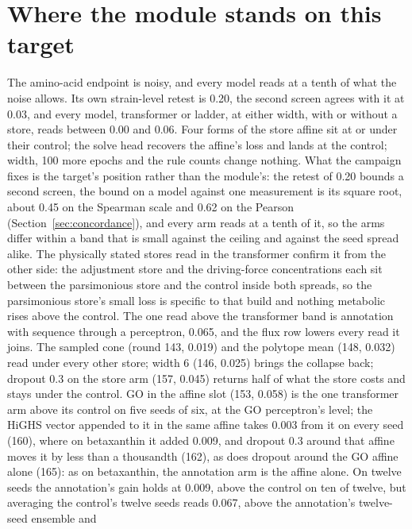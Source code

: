 \section{Where the module stands on this target}
\label{sec:standing}

The amino-acid endpoint is noisy, and every model reads at a tenth of what the noise
allows. Its own strain-level retest is 0.20, the second screen agrees with it at 0.03,
and every model, transformer or ladder, at either width, with or without a store, reads
between 0.00 and 0.06. Four forms of the store affine sit at or under their control; the
solve head recovers the affine's loss and lands at the control; width, 100 more epochs
and the rule counts change nothing. What the campaign fixes is the target's position
rather than the module's: the retest of 0.20 bounds a second screen, the bound on a
model against one measurement is its square root, about 0.45 on the Spearman scale and
0.62 on the Pearson (Section~\ref{sec:concordance}), and every arm reads at a tenth of
it, so the arms differ within a band that is small against the ceiling and against the
seed spread alike. The physically
stated stores read in the transformer confirm it from the other side: the adjustment
store and the driving-force concentrations each sit between the parsimonious store and
the control inside both spreads, so the parsimonious store's small loss is specific to
that build and nothing metabolic rises above the control. The one read above the
transformer band is annotation with sequence through a perceptron, 0.065, and the flux
row lowers every read it joins. The sampled cone (round 143, 0.019) and the polytope
mean (148, 0.032) read under every other store; width 6 (146, 0.025) brings the
collapse back; dropout 0.3 on the store arm (157, 0.045) returns half of what the store
costs and stays under the control. GO in the affine slot (153, 0.058) is the one
transformer arm above its control on five seeds of six, at the GO perceptron's level;
the HiGHS vector appended to it in the same affine takes 0.003 from it on every seed
(160), where on betaxanthin it added 0.009, and dropout 0.3 around that affine moves it
by less than a thousandth (162), as does dropout around the GO affine alone (165): as
on betaxanthin, the annotation arm is the affine alone. On twelve seeds the
annotation's gain holds at 0.009, above the control on ten of twelve, but averaging
the control's twelve seeds reads 0.067, above the annotation's twelve-seed ensemble and
